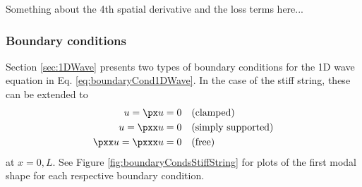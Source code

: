 Something about the 4th spatial derivative and the loss terms here...

\subsubsection{Boundary conditions}
Section \ref{sec:1DWave} presents two types of boundary conditions for the 1D wave equation in Eq. \eqref{eq:boundaryCond1DWave}. In the case of the stiff string, these can be extended to
\begin{subequations}\label{eq:stiffStringBoundConds}
    \begin{align}
        u = \px u &= 0 \quad \text{(clamped)}\label{eq:BCclamped}\\
        u = \pxx u &= 0 \quad \text{(simply supported)}\label{eq:BCsimplySupported}\\
        \pxx u = \pxxx u &= 0 \quad \text{(free)}\label{eq:BCfree}
    \end{align}
\end{subequations}
at $x = 0, L$. See Figure \ref{fig:boundaryCondsStiffString} for plots of the first modal shape for each respective boundary condition. 
\def\figWidth{0.32}
